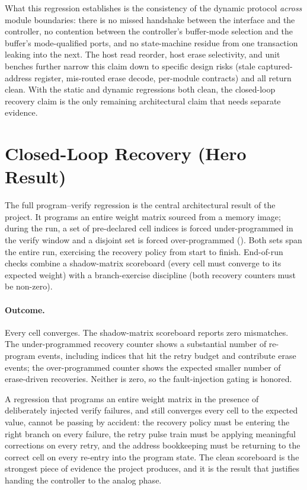 What this regression establishes is the consistency of the dynamic
protocol \emph{across} module boundaries: there is no missed handshake
between the interface and the controller, no contention between the
controller's buffer-mode selection and the buffer's mode-qualified ports,
and no state-machine residue from one transaction leaking into the next.
The host read reorder, host erase selectivity, and unit benches further
narrow this claim down to specific design risks (stale captured-address
register, mis-routed erase decode, per-module contracts) and all return
clean. With the static and dynamic regressions both clean, the
closed-loop recovery claim is the only remaining architectural claim
that needs separate evidence.

\section{Closed-Loop Recovery (Hero Result)}
\label{sec:results-recovery}

The full program--verify regression is the central architectural result
of the project. It programs an entire weight matrix sourced from a memory
image; during the run, a set of pre-declared cell indices is forced
under-programmed in the verify window and a disjoint set is forced
over-programmed (). Both sets span the entire
run, exercising the recovery policy from start to finish. End-of-run
checks combine a shadow-matrix scoreboard (every cell must converge to
its expected weight) with a branch-exercise discipline (both recovery
counters must be non-zero).

\paragraph{Outcome.}
Every cell converges. The shadow-matrix scoreboard reports zero
mismatches. The under-programmed recovery counter shows a substantial
number of re-program events, including indices that hit the retry budget
and contribute erase events; the over-programmed counter shows the
expected smaller number of erase-driven recoveries. Neither is zero, so
the fault-injection gating is honored.

A regression that programs an entire weight matrix in the presence of
deliberately injected verify failures, and still converges every cell to
the expected value, cannot be passing by accident: the recovery policy
must be entering the right branch on every failure, the retry pulse
train must be applying meaningful corrections on every retry, and the
address bookkeeping must be returning to the correct cell on every
re-entry into the program state. The clean scoreboard is the strongest
piece of evidence the project produces, and it is the result that
justifies handing the controller to the analog phase.

